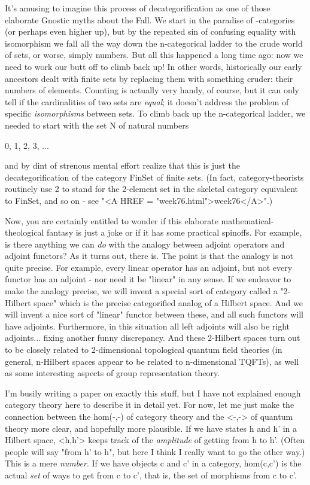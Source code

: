 It's amusing to imagine this process of decategorification as 
one of those elaborate Gnostic myths about the Fall.  We start in
the paradise of \omega -categories (or perhaps even higher up), but
by the repeated sin of confusing equality with isomorphism we fall all
the way down the n-categorical ladder to the crude world of sets, or
worse, simply numbers.  But all this happened a long time ago: now
we need to work our butt off to climb back up!  In other words,
historically our early ancestors dealt with finite sets by replacing
them with something cruder: their numbers of elements.  Counting is
actually very handy, of course, but it can only tell if the
cardinalities of two sets are \emph{equal}; it doesn't address the problem of
specific \emph{isomorphisms} between sets.  To climb back up the
n-categorical ladder, we needed to start with the set N of natural numbers 

0, 1, 2, 3, ...

and by dint of strenous mental effort realize that this is just the
decategorification of the category FinSet of finite sets.  (In fact,
category-theorists routinely use 2 to stand for the 2-element set in
the skeletal category equivalent to FinSet, and so on - see "<A
HREF = "week76.html">week76</A>".)

Now, you are certainly entitled to wonder if this elaborate
mathematical-theological fantasy is just a joke or if it has some
practical spinoffs.  For example, is there anything we can \emph{do}
with the analogy between adjoint operators and adjoint functors?  As
it turns out, there is.  The point is that the analogy is not quite
precise.  For example, every linear operator has an adjoint, but not
every functor has an adjoint - nor need it be "linear" in
any sense.  If we endeavor to make the analogy precise, we will invent
a special sort of category called a "2-Hilbert space" which
is the precise categorified analog of a Hilbert space.  And we will
invent a nice sort of "linear" functor between these, and
all such functors will have adjoints.  Furthermore, in this situation
all left adjoints will also be right adjoints... fixing another funny
discrepancy.  And these 2-Hilbert spaces turn out to be closely
related to 2-dimensional topological quantum field theories (in
general, n-Hilbert spaces appear to be related to n-dimensional
TQFTs), as well as some interesting aspects of group representation
theory.

I'm busily writing a paper on exactly this stuff, but I have not
explained enough category theory here to describe it in detail yet.  For
now, let me just make the connection between the hom(-,-) of category
theory and the <-,-> of quantum theory more clear, and hopefully
more plausible.  If we have states h and h' in a Hilbert space,
<h,h'> keeps track of the \emph{amplitude} of getting from h to
h'.  (Often people will say "from h' to h", but here I think I
really want to go the other way.)  This is a mere \emph{number}.  If
we have objects c and c' in a category, hom(c,c') is the actual \emph{set} of
ways to get from c to c', that is, the set of morphisms from c to c'.

